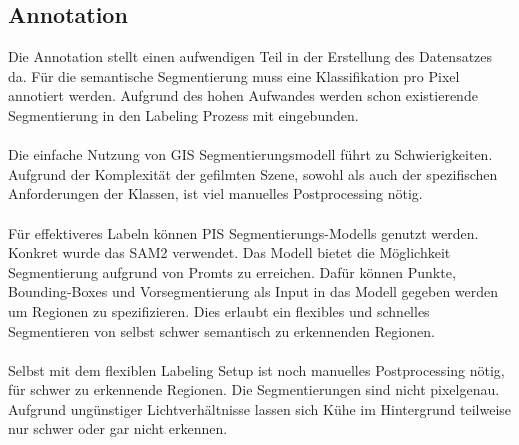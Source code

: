 \documentclass[12pt,DIV=15,BCOR=15mm,twoside,headsepline,abstract=true,listof=totoc,bibliography=totoc]{scrreprt}
\theoremstyle{remark}    %
\begin{document}
    \subsection{Annotation}
    Die Annotation stellt einen aufwendigen Teil in der Erstellung des Datensatzes da. Für die semantische Segmentierung muss eine Klassifikation pro Pixel annotiert 
    werden. Aufgrund des hohen Aufwandes werden schon existierende Segmentierung in den Labeling Prozess mit eingebunden.\\\\
    Die einfache Nutzung von \ac{GIS} Segmentierungsmodell führt zu Schwierigkeiten. Aufgrund der Komplexität der gefilmten Szene,
    sowohl als auch der spezifischen Anforderungen der Klassen, ist viel manuelles Postprocessing nötig.\\\\
    Für effektiveres Labeln können \ac{PIS} Segmentierungs-Modells genutzt werden. Konkret wurde das SAM2 \cite{ravi2024sam2segmentimages} verwendet. Das Modell 
    bietet die Möglichkeit Segmentierung aufgrund von Promts zu erreichen. Dafür können Punkte, Bounding-Boxes und Vorsegmentierung als Input in das Modell gegeben 
    werden um Regionen zu spezifizieren. Dies erlaubt ein flexibles und schnelles Segmentieren von selbst schwer semantisch zu erkennenden Regionen.\\\\
    Selbst mit dem flexiblen Labeling Setup ist noch manuelles Postprocessing nötig, für schwer zu erkennende Regionen.
    Die Segmentierungen sind nicht pixelgenau. Aufgrund ungünstiger Lichtverhältnisse lassen sich Kühe im Hintergrund teilweise nur schwer oder gar nicht erkennen.
\end{document}
